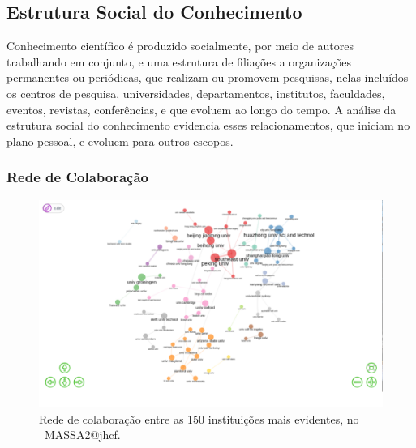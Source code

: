 \subsection{Estrutura Social  do Conhecimento}

Conhecimento científico é produzido socialmente, por meio de autores trabalhando em conjunto, e uma estrutura de filiações a organizações permanentes ou periódicas, que realizam ou promovem pesquisas, nelas incluídos os centros de pesquisa, universidades, departamentos, institutos, faculdades, eventos, revistas, conferências, e que evoluem ao longo do tempo. A análise da estrutura social do conhecimento evidencia esses relacionamentos, que iniciam no plano pessoal, e evoluem para outros escopos.

\subsubsection{Rede de Colaboração}

\begin{figure}
    \centering
    \includegraphics[width=1\textwidth]{exploratory-data-analysis/jhcf/PesqBibliogr/SimulacaoMultiagente/WoS-20220203/Estrutura/Social/MASSA2-Collaboration-Network-150instit.png}
    \caption{Rede de colaboração entre as 150 instituições mais evidentes, no  \dataset\ MASSA2@jhcf.}
    \label{fig:MASSA2-Collaboration-Network-150instit}
\end{figure}

